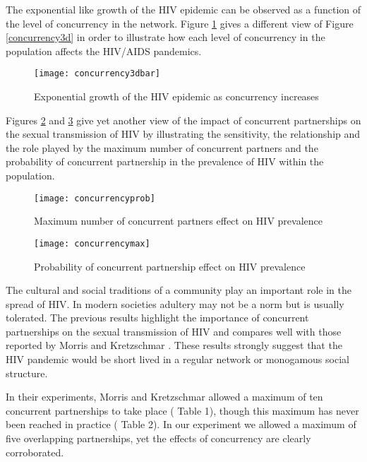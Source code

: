 The exponential like growth of the HIV epidemic can be observed as a function of the
level of concurrency in the network. Figure \ref{concurrency3dbar} gives a different view
of Figure \ref{concurrency3d} in order to illustrate how each level of concurrency in the
population affects the HIV/AIDS pandemics.
\begin{figure}[h]
\texttt{[image: concurrency3dbar]}
\caption{Exponential growth of the HIV epidemic as concurrency increases}
\label{concurrency3dbar}
\end{figure}

Figures \ref{concurrencyprob} and  \ref{concurrencymax} give yet another view of the
impact of concurrent partnerships on the sexual transmission of HIV by illustrating the
sensitivity, the relationship and the role played by the maximum number of concurrent
partners and the probability of concurrent partnership in the prevalence of HIV within
the population.
\begin{figure}[ht]
\texttt{[image: concurrencyprob]}
\caption{Maximum number of concurrent partners effect on HIV prevalence}
\label{concurrencyprob}
\end{figure}
\begin{figure}[ht]
\texttt{[image: concurrencymax]}
\caption{Probability of concurrent partnership effect on HIV prevalence}
\label{concurrencymax}
\end{figure}
\clearpage

The cultural and social traditions of a community play an important role in the spread of
HIV. In modern societies adultery may not be a norm but is usually tolerated. The
previous results highlight the importance of concurrent partnerships on the sexual
transmission of HIV and compares well with those reported by Morris and Kretzschmar
\cite{morrism1997,Kretzschmar2000}. These results strongly suggest that the HIV pandemic
would be short lived in a regular network or monogamous social structure.

In their experiments, Morris and Kretzschmar allowed a maximum of ten concurrent
partnerships to take place (\cite{Morris1995} Table 1), though this maximum has never
been reached in practice (\cite{Kretschmar1996} Table 2). In our experiment we allowed a
maximum of five overlapping partnerships, yet the effects of concurrency are clearly
corroborated.

